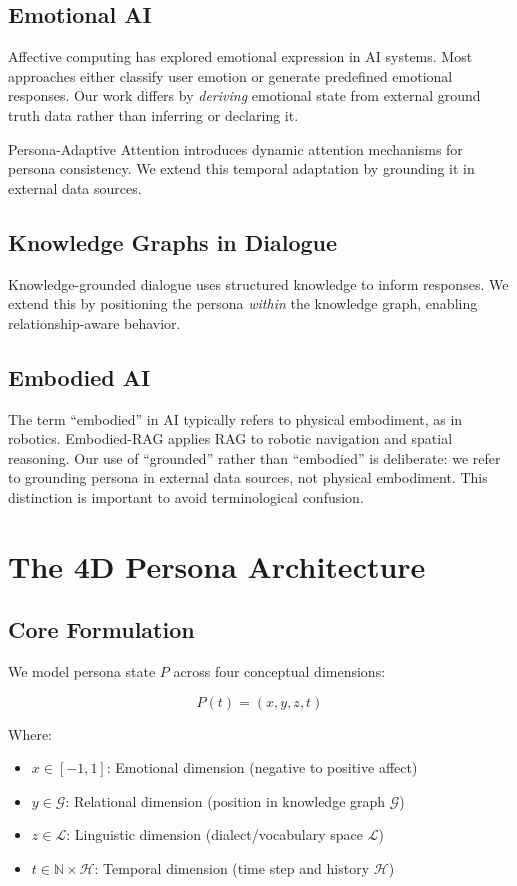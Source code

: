 \documentclass[11pt]{article}
\begin{document}
\subsection{Emotional AI}
Affective computing \cite{picard1997affective} has explored emotional expression in AI systems. Most approaches either classify user emotion or generate predefined emotional responses. Our work differs by \textit{deriving} emotional state from external ground truth data rather than inferring or declaring it.

Persona-Adaptive Attention \cite{personaadaptive2023} introduces dynamic attention mechanisms for persona consistency. We extend this temporal adaptation by grounding it in external data sources.

\subsection{Knowledge Graphs in Dialogue}
Knowledge-grounded dialogue \cite{dinan2018wizard} uses structured knowledge to inform responses. We extend this by positioning the persona \textit{within} the knowledge graph, enabling relationship-aware behavior.

\subsection{Embodied AI}
The term ``embodied'' in AI typically refers to physical embodiment, as in robotics. Embodied-RAG \cite{embodiedrag2024} applies RAG to robotic navigation and spatial reasoning. Our use of ``grounded'' rather than ``embodied'' is deliberate: we refer to grounding persona in external data sources, not physical embodiment. This distinction is important to avoid terminological confusion.

\section{The 4D Persona Architecture}

\subsection{Core Formulation}

We model persona state $P$ across four conceptual dimensions:

\begin{equation}
P(t) = (x, y, z, t)
\end{equation}

Where:
\begin{itemize}
    \item $x \in [-1, 1]$: Emotional dimension (negative to positive affect)
    \item $y \in \mathcal{G}$: Relational dimension (position in knowledge graph $\mathcal{G}$)
    \item $z \in \mathcal{L}$: Linguistic dimension (dialect/vocabulary space $\mathcal{L}$)
    \item $t \in \mathbb{N} \times \mathcal{H}$: Temporal dimension (time step and history $\mathcal{H}$)
\end{itemize}
\end{document}
